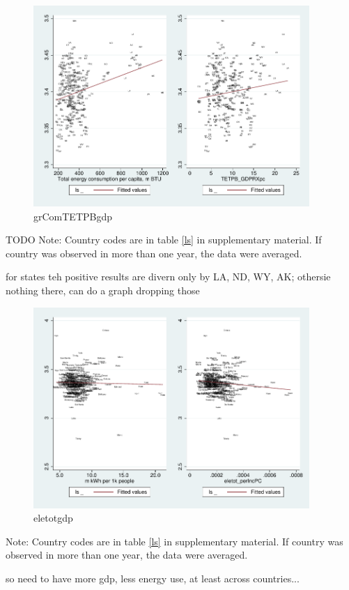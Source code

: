 \documentclass[10pt, letterpaper]{article}
\begin{document}
\begin{spacing}{1.4}
\begin{figure}[H]
 \includegraphics[height=3in]{graphsAndTables/grComTETPB_gdp.pdf}\centering
\caption{grComTETPBgdp}\label{grComTETPBgdp}
\end{figure}
{\scriptsize TODO Note: Country codes are in table \ref{ls} in supplementary
  material. If country was observed in more than one year, the data were averaged.}

for states teh positive results are divern only by LA, ND, WY, AK; othersie
nothing there, can do a graph dropping those

\begin{figure}[H]
 \includegraphics[height=3in]{graphsAndTables/eletot_gdp.pdf}\centering
\caption{eletotgdp}\label{eletotgdp}
\end{figure}
{\scriptsize Note: Country codes are in table \ref{ls} in supplementary
  material. If country was observed in more than one year, the data were averaged.}



so need to have more gdp, less energy use, at least across countries...



\end{spacing}
\end{document}
